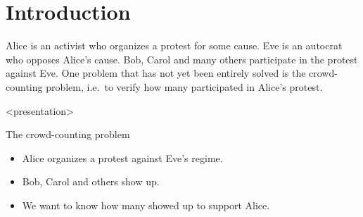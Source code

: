 \mode*

\section{Introduction}%
\label{Introduction}

Alice is an activist who organizes a protest for some cause.
Eve is an autocrat who opposes Alice's cause.
Bob, Carol and many others participate in the protest against Eve.
One problem that has not yet been entirely solved is the crowd-counting 
problem, i.e.\ to verify how many participated in Alice's protest.


\begin{frame}<presentation>
  \begin{block}{The crowd-counting problem}
    \begin{itemize}
      \item Alice organizes a protest against Eve's regime.
      \item Bob, Carol and others show up.
      \item We want to know how many showed up to support Alice.
    \end{itemize}
  \end{block}
\end{frame}


